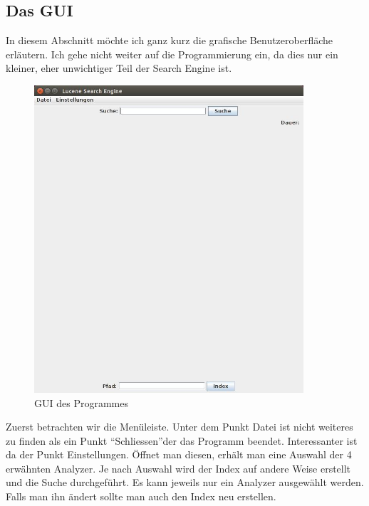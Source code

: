 \documentclass[12pt,a4paper,ngerman]{report}
\begin{document}
\subsection*{Das GUI}
In diesem Abschnitt möchte ich ganz kurz die grafische Benutzeroberfläche erläutern. Ich gehe nicht weiter auf die Programmierung ein, da dies nur ein kleiner, eher unwichtiger Teil der Search Engine ist.
\begin{figure}[h!]
\centering
\includegraphics[width=10cm]{img/Lucene_Search_Engine_1.jpg}
\caption{GUI des Programmes\protect\footnotemark}
\end{figure}
Zuerst betrachten wir die Menüleiste. Unter dem Punkt Datei ist nicht weiteres zu finden als ein Punkt \textquotedblleft Schliessen\textquotedblright der das Programm beendet. Interessanter ist da der Punkt Einstellungen. Öffnet man diesen, erhält man eine Auswahl der 4 erwähnten Analyzer. Je nach Auswahl wird der Index auf andere Weise erstellt und die Suche durchgeführt. Es kann jeweils nur ein Analyzer ausgewählt werden. Falls man ihn ändert sollte man auch den Index neu erstellen.
\end{document}
